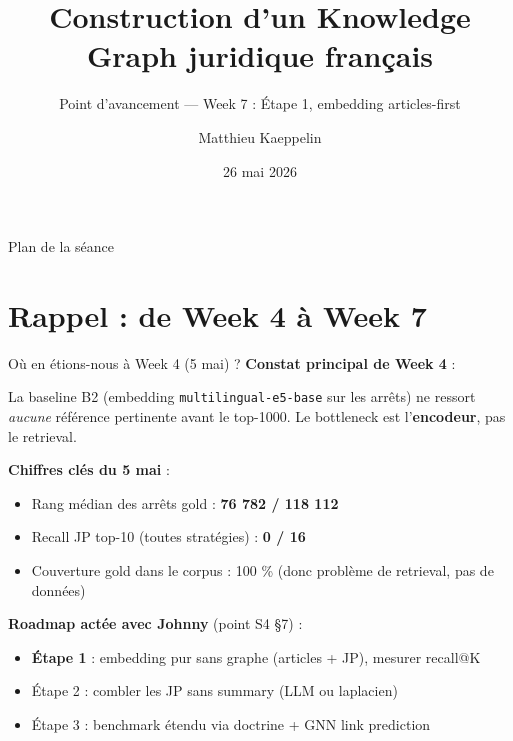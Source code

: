 \documentclass[aspectratio=169,10pt]{beamer}
\title[KG juridique FR --- Week 7]{Construction d'un Knowledge Graph juridique français}
\subtitle{Point d'avancement --- Week 7 : Étape 1, embedding articles-first}
\author{Matthieu Kaeppelin}
\institute{Stage FE Recherche}
\date{26 mai 2026}
\newcommand{\keybox}[1]{%
  \begin{center}
  \colorbox{accentsoft}{\parbox{0.92\linewidth}{\centering #1}}
  \end{center}}
\begin{document}
\begin{frame}
  \titlepage
\end{frame}

\begin{frame}{Plan de la séance}
  \tableofcontents[hideallsubsections]
\end{frame}

\section{Rappel : de Week 4 à Week 7}

\begin{frame}{Où en étions-nous à Week 4 (5 mai) ?}
  \small
  \textbf{Constat principal de Week 4} :

  \keybox{La baseline B2 (embedding \texttt{multilingual-e5-base} sur les arrêts) ne
  ressort \emph{aucune} référence pertinente avant le top-1000. Le bottleneck est
  l'\textbf{encodeur}, pas le retrieval.}

  \vspace{0.5em}
  \textbf{Chiffres clés du 5 mai} :
  \begin{itemize}\setlength\itemsep{0.2em}
    \item Rang médian des arrêts gold : \textcolor{warn}{\textbf{76 782 / 118 112}}
    \item Recall JP top-10 (toutes stratégies) : \textcolor{warn}{\textbf{0 / 16}}
    \item Couverture gold dans le corpus : \textcolor{ok}{100 \%} (donc problème de retrieval, pas de données)
  \end{itemize}

  \vspace{0.5em}
  \textbf{Roadmap actée avec Johnny} (point S4 §7) :
  \begin{itemize}\setlength\itemsep{0.2em}
    \item \textbf{Étape 1} : embedding pur sans graphe (articles + JP), mesurer recall@K
    \item Étape 2 : combler les JP sans summary (LLM ou laplacien)
    \item Étape 3 : benchmark étendu via doctrine + GNN link prediction
  \end{itemize}
\end{frame}
\end{document}
